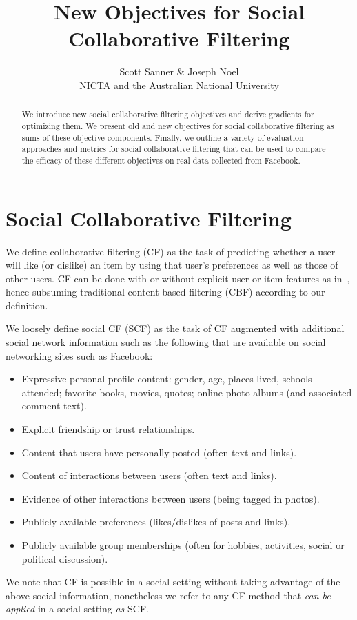 \documentclass[11pt,a4paper]{article}
\begin{document}
\title{New Objectives for Social Collaborative Filtering}

\author{Scott Sanner \& Joseph Noel \\
NICTA and the Australian National University
}

\maketitle

\begin{abstract}
We introduce new social collaborative filtering objectives and derive
gradients for optimizing them.  We present old and new objectives for
social collaborative filtering as sums of these objective
components.  Finally, we outline a variety of evaluation
approaches and metrics for social collaborative filtering that can be
used to compare the efficacy of these different objectives on real data
collected from Facebook.
\end{abstract}

\tableofcontents

\section{Social Collaborative Filtering}

We define collaborative filtering (CF) as the task of predicting
whether a user will like (or dislike) an item by using that user's
preferences as well as those of other users.  CF can be done with or
without explicit user or item features as in~\cite{matchbox}, hence
subsuming traditional content-based filtering (CBF) according to our
definition.

We loosely define social CF (SCF) as the task of CF augmented with
additional social network information such as the following that
are available on social networking sites such as Facebook:
\begin{itemize}
\item Expressive personal profile content: gender, age, places lived, schools
attended; favorite books, movies, quotes; online photo albums (and associated comment text).
\item Explicit friendship or trust relationships.
\item Content that users have personally posted (often text and links).
\item Content of interactions between users (often text and links).
\item Evidence of other interactions between users (being tagged in photos).
\item Publicly available preferences (likes/dislikes of posts and links).
\item Publicly available group memberships (often for hobbies, activities, social or political discussion).
\end{itemize}
We note that CF is possible in a social setting without taking advantage
of the above social information, nonetheless we refer to any CF method
that \emph{can be applied} in a social setting \emph{as} SCF.
\end{document}
